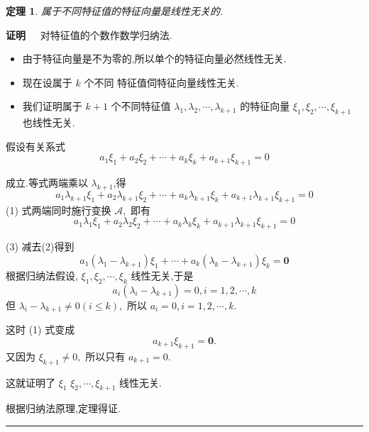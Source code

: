 \documentclass[13pt]{beamer}
\newtheorem{thm}{定理}
\def\qed{\nopagebreak\hfill{\rule{4pt}{7pt}}\medbreak}
\def\pf{{\bf 证明~~ }}
\begin{document}
\begin{frame}
\begin{thm}
属于不同特征值的特征向量是线性无关的.
\end{thm}
\pf
对特征值的个数作数学归纳法.
\begin{itemize}
	\item 由于特征向量是不为零的,所以单个的特征向量必然线性无关. 
	\item 现在设属于 $k$ 个不同 特征值伺特征向量线性无关.
	\item 我们证明属于 $k+1$ 个不同特征值 $\lambda_{1}, \lambda_{2}, \cdots, \lambda_{k+1}$ 的特征向量 ${\xi}_{1}, {\xi}_{2}, \cdots, {\xi}_{k+1}$ 也线性无关.
\end{itemize}
\setcounter{equation}{0}

假设有关系式
\begin{equation}
a_{1} \xi_{1}+a_{2} \xi_{2}+\cdots+a_{k} \xi_{k}+a_{k+1} \xi_{k+1}=0
\end{equation}

成立.等式两端乘以 $\lambda_{k+1}$,得
\begin{equation}
a_{1} \lambda_{k+1} \xi_{1}+a_{2} \lambda_{k+1} \xi_{2}+\cdots+a_{k} \lambda_{k+1} \xi_{k}+a_{k+1} \lambda_{k+1} \xi_{k+1}=0
\end{equation}
(1) 式两端同时施行变换 $\mathscr{A},$ 即有 
\begin{equation}
a_{1} \lambda_{1} \xi_{1}+a_{2} \lambda_{2} \xi_{2}+\cdots+a_{k} \lambda_{k} \xi_{k}+a_{k+1} \lambda_{k+1} \xi_{k+1}=0\end{equation}
\end{frame}


\begin{frame}


(3) 减去(2)得到 $$a_{1}\left(\lambda_{1}-\lambda_{k+1}\right) \xi_{1}+\cdots+a_{k}\left(\lambda_{k}-\lambda_{k+1}\right) \xi_{k}=\mathbf{0}$$
根据归纳法假设,  ${\xi}_{1}, {\xi}_{2}, \cdots, {\xi}_{k}$ 线性无关,于是
\[
a_{i}\left(\lambda_{i}-\lambda_{k+1}\right)=0, i=1,2, \cdots, k
\]
但 $\lambda_{i}-\lambda_{k+1} \neq 0(i \leqslant k),$ 所以 $a_{i}=0, i=1,2, \cdots, k$.

这时 (1) 式变成
$$a_{k+1} \xi_{k+1}=\mathbf{0}.$$
又因为 $\xi_{k+1} \neq 0,$ 所以只有 $a_{k+1}=0.$ 

这就证明了 $\xi_{1}$
${\xi}_{2}, \cdots, {\xi}_{k+1}$ 线性无关.

根据归纳法原理,定理得证. \qed

\end{frame}
\end{document}
